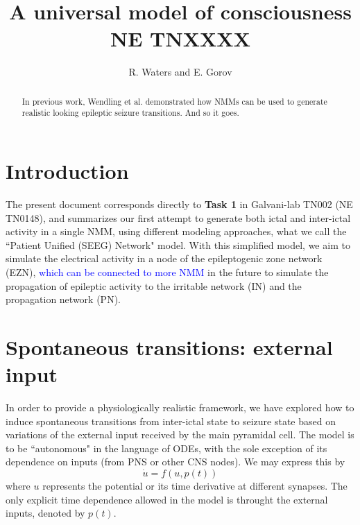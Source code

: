 \documentclass[11pt,a4,oneside]{amsart}
\title[NE TNXXXX]{A universal model of consciousness \\  NE TNXXXX}
\author{R. Waters  and E. Gorov}
\begin{document}
\maketitle

\begin{abstract}
\normalsize
    In previous work,  Wendling et al. \cite{wendling02} demonstrated how NMMs can be used to generate realistic looking epileptic seizure transitions.  And so it goes.

\end{abstract}

\tableofcontents


\clearpage
\section{Introduction}
\label{sec:introduction}
The present document corresponds directly to \textbf{Task 1} in Galvani-lab TN002 (NE  TN0148), and summarizes our first attempt to generate both ictal and inter-ictal activity in a single NMM, using different modeling approaches, what we call the ``Patient Unified (SEEG) Network" model. With this simplified model, we aim to simulate the electrical activity in a node of the epileptogenic zone network (EZN), \textcolor{blue}{which can be connected to more NMM} in the future to simulate the propagation of epileptic activity to the irritable network (IN) and the propagation network (PN).

\section{Spontaneous transitions: external input}
\label{sec:input}
In order to provide a physiologically realistic framework, we have  explored how to induce spontaneous transitions from inter-ictal state to seizure state based on variations of the external input received by the main pyramidal cell. The model is to be  ``autonomous" in the language of ODEs, with the sole exception of its dependence on inputs (from PNS or other CNS nodes). We may express this by
\begin{equation}
\dot u = f(u,p(t))
\label{eq:rate_equation}
\end{equation}
where $u$ represents the potential or its time derivative at different synapses. The only explicit time dependence allowed in the model is throught the external inputs, denoted by $p(t)$. 
\end{document}
